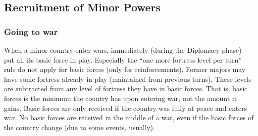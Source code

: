 



\subsection{Recruitment of Minor Powers}
\label{chLogistic:Recruitment of minors}
\subsubsection{Going to war}
\aparag When a minor country enter wars, immediately (during the Diplomacy
phase) put all its basic force in play. Especially the ``one more fortress
level per turn'' rule do not apply for basic forces (only for
reinforcements).
\bparag Former majors may have some fortress already in play (maintained from
previous turns). These levels are subtracted from any level of fortress they
have in basic forces. That is, basic forces is the minimum the country has
upon entering war, not the amount it gains.
\bparag Basic forces are only received if the country was fully at peace and
enters war. No basic forces are received in the middle of a war, even if the
basic forces of the country change (due to some events, usually).

